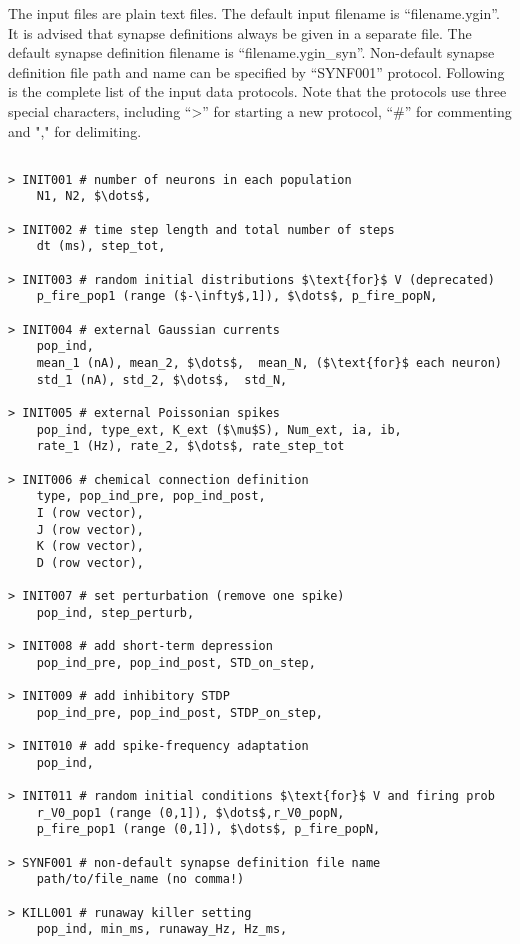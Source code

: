 \documentclass{article}
\begin{document}
The input files are plain text files.
The default input filename is ``filename.ygin''.
It is advised that synapse definitions always be given in a separate file.
The default synapse definition filename is ``filename.ygin\_syn''.
Non-default synapse definition file path and name can be specified by ``SYNF001'' protocol.
Following is the complete list of the input data protocols.
Note that the protocols use three special characters, including ``\textgreater'' for starting a new protocol, ``\#'' for commenting and "," for delimiting.


\begin{lstlisting}[mathescape]

> INIT001 # number of neurons in each population
	N1, N2, $\dots$,

> INIT002 # time step length and total number of steps
	dt (ms), step_tot,

> INIT003 # random initial distributions $\text{for}$ V (deprecated)
	p_fire_pop1 (range ($-\infty$,1]), $\dots$, p_fire_popN, 

> INIT004 # external Gaussian currents
	pop_ind, 
	mean_1 (nA), mean_2, $\dots$,  mean_N, ($\text{for}$ each neuron)
	std_1 (nA), std_2, $\dots$,  std_N, 

> INIT005 # external Poissonian spikes
	pop_ind, type_ext, K_ext ($\mu$S), Num_ext, ia, ib,
	rate_1 (Hz), rate_2, $\dots$, rate_step_tot

> INIT006 # chemical connection definition
	type, pop_ind_pre, pop_ind_post,
	I (row vector),
	J (row vector),
	K (row vector),
	D (row vector),

> INIT007 # set perturbation (remove one spike)
	pop_ind, step_perturb,

> INIT008 # add short-term depression
	pop_ind_pre, pop_ind_post, STD_on_step,

> INIT009 # add inhibitory STDP
	pop_ind_pre, pop_ind_post, STDP_on_step,
	
> INIT010 # add spike-frequency adaptation 
	pop_ind,

> INIT011 # random initial conditions $\text{for}$ V and firing prob
	r_V0_pop1 (range (0,1]), $\dots$,r_V0_popN, 
	p_fire_pop1 (range (0,1]), $\dots$, p_fire_popN, 
	
> SYNF001 # non-default synapse definition file name
	path/to/file_name (no comma!)

> KILL001 # runaway killer setting
	pop_ind, min_ms, runaway_Hz, Hz_ms,


\end{lstlisting}
\end{document}
